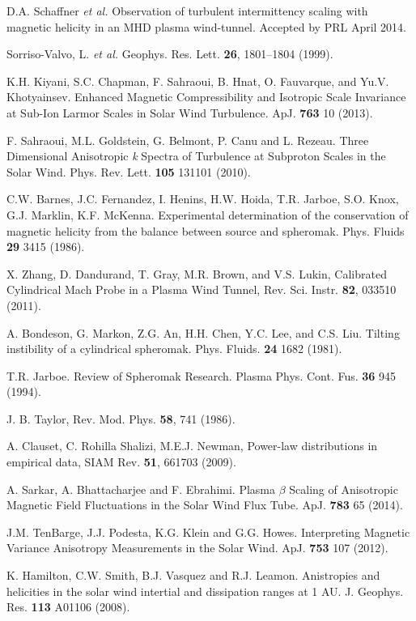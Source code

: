 \documentclass[aip,prl,amsmath,amssymb,reprint,superscriptaddress]{revtex4-1} %
\begin{document}
\begin{thebibliography}{99}
 D.A. Schaffner {\it et al.} Observation of turbulent intermittency scaling with magnetic helicity in an MHD plasma wind-tunnel. Accepted by PRL April 2014.

Sorriso-Valvo, L. {\it et al.} Geophys. Res. Lett. {\bf 26}, 1801–1804 (1999).

 K.H. Kiyani, S.C. Chapman, F. Sahraoui, B. Hnat, O. Fauvarque, and Yu.V. Khotyainsev. Enhanced Magnetic Compressibility and Isotropic Scale Invariance at Sub-Ion Larmor Scales in Solar Wind Turbulence. ApJ. {\bf 763} 10 (2013).

 F. Sahraoui, M.L. Goldstein, G. Belmont, P. Canu and L. Rezeau. Three Dimensional Anisotropic {\it k} Spectra of Turbulence at Subproton Scales in the Solar Wind. Phys. Rev. Lett. {\bf 105} 131101 (2010).

C.W. Barnes, J.C. Fernandez, I. Henins, H.W. Hoida, T.R. Jarboe, S.O. Knox, G.J. Marklin, K.F. McKenna. Experimental determination of the conservation of magnetic helicity from the balance between source and spheromak. Phys. Fluids {\bf 29} 3415 (1986).

 X. Zhang, D. Dandurand, T. Gray, M.R. Brown, and V.S. Lukin, Calibrated Cylindrical Mach Probe in a Plasma Wind Tunnel, Rev. Sci. Instr. {\bf 82}, 033510 (2011).

 A. Bondeson, G. Markon, Z.G. An, H.H. Chen, Y.C. Lee, and C.S. Liu. Tilting instibility of a cylindrical spheromak. Phys. Fluids. {\bf 24} 1682 (1981).

T.R. Jarboe. Review of Spheromak Research. Plasma Phys. Cont. Fus. {\bf 36} 945 (1994).

 J. B. Taylor, Rev. Mod. Phys. {\bf 58}, 741 (1986).

A. Clauset, C. Rohilla Shalizi, M.E.J. Newman, Power-law distributions in empirical data, SIAM Rev. {\bf 51}, 661703 (2009).

A. Sarkar, A. Bhattacharjee and F. Ebrahimi. Plasma $\beta$ Scaling of Anisotropic Magnetic Field Fluctuations in the Solar Wind Flux Tube. ApJ. {\bf 783} 65 (2014).

 J.M. TenBarge, J.J. Podesta, K.G. Klein and G.G. Howes. Interpreting Magnetic Variance Anisotropy Measurements in the Solar Wind. ApJ. {\bf 753} 107 (2012).

 K. Hamilton, C.W. Smith, B.J. Vasquez and R.J. Leamon. Anistropies and helicities in the solar wind intertial and dissipation ranges at 1 AU. J. Geophys. Res. {\bf 113} A01106 (2008).


\end{thebibliography}
\end{document}
